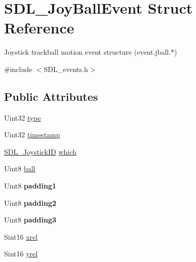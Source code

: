 \hypertarget{struct_s_d_l___joy_ball_event}{}\section{S\+D\+L\+\_\+\+Joy\+Ball\+Event Struct Reference}
\label{struct_s_d_l___joy_ball_event}


Joystick trackball motion event structure (event.\+jball.$\ast$)  




{\ttfamily \#include $<$S\+D\+L\+\_\+events.\+h$>$}

\subsection*{Public Attributes}
\begin{DoxyCompactItemize}
\item 
Uint32 \mbox{\hyperlink{struct_s_d_l___joy_ball_event_a0b192b95a043cb494b27ed9b27e84db1}{type}}
\item 
Uint32 \mbox{\hyperlink{struct_s_d_l___joy_ball_event_aa8e4fb91af62e316bb9a3219ab76148d}{timestamp}}
\item 
\mbox{\hyperlink{_s_d_l__joystick_8h_a3c3d32500cb08f76ee8077983912c0bd}{S\+D\+L\+\_\+\+Joystick\+ID}} \mbox{\hyperlink{struct_s_d_l___joy_ball_event_a4e2e185717d529167cd0bea21093c454}{which}}
\item 
Uint8 \mbox{\hyperlink{struct_s_d_l___joy_ball_event_add4eb0daeaf95ae56e8c7cfcec560242}{ball}}
\item 
\mbox{\label{struct_s_d_l___joy_ball_event_aff75a6519ca2a19cffdc14ebf4626613}} 
Uint8 {\bfseries padding1}
\item 
\mbox{\label{struct_s_d_l___joy_ball_event_a0ea3071b99ac096b0157714f01ff04f8}} 
Uint8 {\bfseries padding2}
\item 
\mbox{\label{struct_s_d_l___joy_ball_event_acb700712f1a4070bc114ef9d55b00640}} 
Uint8 {\bfseries padding3}
\item 
Sint16 \mbox{\hyperlink{struct_s_d_l___joy_ball_event_a959a8473aa1964e5e1778c27a9ffd261}{xrel}}
\item 
Sint16 \mbox{\hyperlink{struct_s_d_l___joy_ball_event_a28ad48a9eb7a5d3ff62ccba09fcead76}{yrel}}
\end{DoxyCompactItemize}


